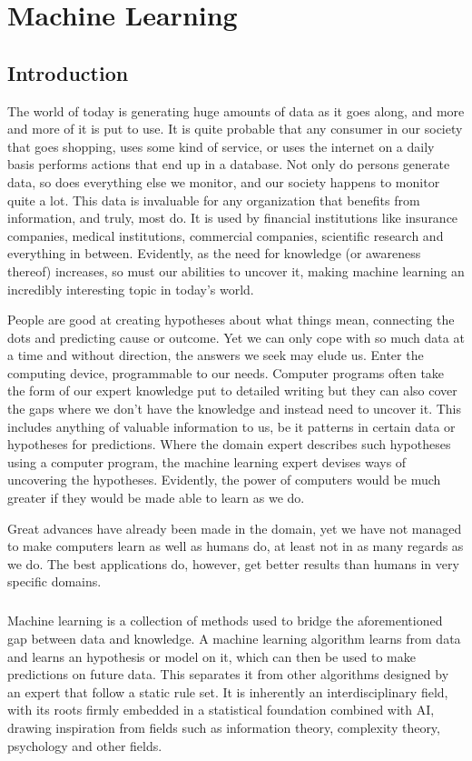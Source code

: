 \chapter{Machine Learning}

\section{Introduction}
The world of today is generating huge amounts of data
as it goes along,
and more and more of it is put to use.
It is quite probable that any consumer in our society
that goes shopping,
uses some kind of service,
or uses the internet
on a daily basis
performs actions that end up in a database.
Not only do persons generate data,
so does everything else we monitor,
and our society happens to monitor quite a lot.
This data is invaluable for any organization that benefits
from information,
and truly, most do.
It is used by financial institutions like insurance companies,
medical institutions, commercial companies, scientific research
and everything in between.
Evidently, as the need for knowledge (or awareness thereof)
increases, so must our abilities to uncover it,
making machine learning an incredibly interesting topic
in today's world.

People are good at creating hypotheses
about what things mean,
connecting the dots
and predicting cause or outcome.
Yet we can only cope
with so much data at a time
and without direction,
the answers we seek may elude us.
Enter the computing device,
programmable to our needs.
Computer programs often take the form
of our expert knowledge put to detailed writing
but they can also cover the gaps where
we don't have the knowledge
and instead need to uncover it.
This includes anything of valuable information to us,
be it patterns in certain data or hypotheses for predictions.
Where the domain expert describes such hypotheses
using a computer program,
the machine learning expert devises ways of uncovering
the hypotheses.
Evidently, the power of computers would be much greater
if they would be made able to learn as we do.

Great advances have already been made in the domain,
yet we have not managed to make computers learn
as well as humans do,
at least not in as many regards as we do.
The best applications do, however,
get better results than humans in very specific domains.


\paragraph{}
Machine learning is a collection of methods
used to bridge the aforementioned gap
between data and knowledge.
A machine learning algorithm learns from data
and learns an hypothesis or model on it,
which can then be used to make predictions on future data.
This separates it from other algorithms
designed by an expert
that follow a static rule set.
It is inherently an interdisciplinary field,
with its roots firmly embedded
in a statistical foundation
combined with AI,
drawing inspiration from fields such as
information theory,
complexity theory,
psychology
and other fields.

